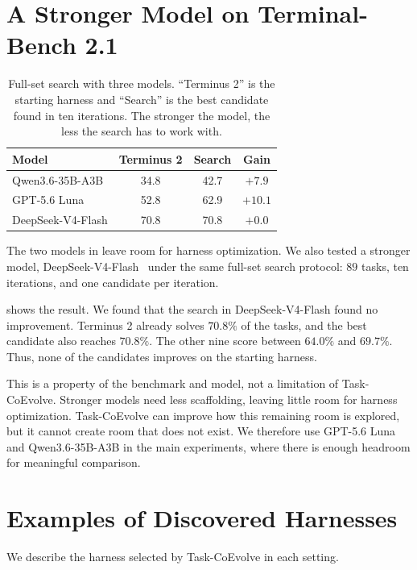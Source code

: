 \documentclass{article} %
\begin{document}
\section{A Stronger Model on Terminal-Bench 2.1}
\label{app:stronger_model}
\begin{table}[t]
\centering
\caption{Full-set search with three models. ``Terminus 2'' is the starting harness
and ``Search'' is the best candidate found in ten iterations. The stronger the
model, the less the search has to work with.}
\label{table:stronger_model}
\small
\setlength{\tabcolsep}{6pt}
\begin{tabular}{lccc}
\toprule
Model & Terminus 2 & Search & Gain \\
\midrule
Qwen3.6-35B-A3B & 34.8 & 42.7 & $+7.9$ \\
GPT-5.6 Luna & 52.8 & 62.9 & $+10.1$ \\
DeepSeek-V4-Flash & 70.8 & 70.8 & $+0.0$ \\
\bottomrule
\end{tabular}
\end{table}


The two models in  leave room for harness optimization. We also tested a stronger model, DeepSeek-V4-Flash~\citep{deepseekai2026deepseekv4} under the same full-set search protocol: $89$ tasks, ten iterations, and one candidate per iteration.


 shows the result.
We found that the search in DeepSeek-V4-Flash found no improvement. Terminus 2 already solves $70.8\%$ of the tasks, and the best candidate also reaches $70.8\%$. The other nine score between $64.0\%$ and $69.7\%$. Thus, none of the candidates improves on the starting harness.

This is a property of the benchmark and model, not a limitation of Task-CoEvolve. Stronger models need less scaffolding, leaving little room for harness optimization. Task-CoEvolve can improve how this remaining room is explored, but it cannot create room that does not exist. We therefore use GPT-5.6 Luna and Qwen3.6-35B-A3B in the main experiments, where there is enough headroom for meaningful comparison.


\section{Examples of Discovered Harnesses}
\label{app:examples}

We describe the harness selected by Task-CoEvolve in each setting.
\end{document}
